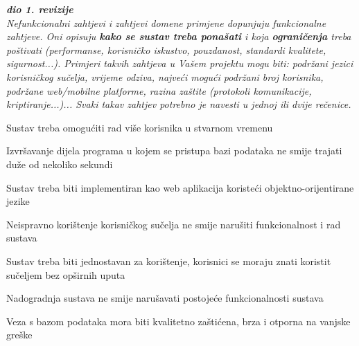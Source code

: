 			\textbf{\textit{dio 1. revizije}}\\
		 
			 \textit{Nefunkcionalni zahtjevi i zahtjevi domene primjene dopunjuju funkcionalne zahtjeve. Oni opisuju \textbf{kako se sustav treba ponašati} i koja \textbf{ograničenja} treba poštivati (performanse, korisničko iskustvo, pouzdanost, standardi kvalitete, sigurnost...). Primjeri takvih zahtjeva u Vašem projektu mogu biti: podržani jezici korisničkog sučelja, vrijeme odziva, najveći mogući podržani broj korisnika, podržane web/mobilne platforme, razina zaštite (protokoli komunikacije, kriptiranje...)... Svaki takav zahtjev potrebno je navesti u jednoj ili dvije rečenice.}
			 \begin{packed_item}
			 \item  Sustav treba omogućiti rad više korisnika u stvarnom vremenu
			 \item Izvršavanje dijela programa u kojem se pristupa bazi podataka ne smije trajati duže od nekoliko sekundi
			 \item Sustav treba biti implementiran kao web aplikacija koristeći objektno-orijentirane jezike
			 \item Neispravno korištenje korisničkog sučelja ne smije narušiti funkcionalnost i rad sustava
			 \item Sustav treba biti jednostavan za korištenje, korisnici se moraju znati koristit sučeljem bez opširnih uputa
			 \item Nadogradnja sustava ne smije narušavati postojeće funkcionalnosti sustava
			 \item Veza s bazom podataka mora biti kvalitetno zaštićena, brza i otporna na vanjske greške
			 \end{packed_item}
	